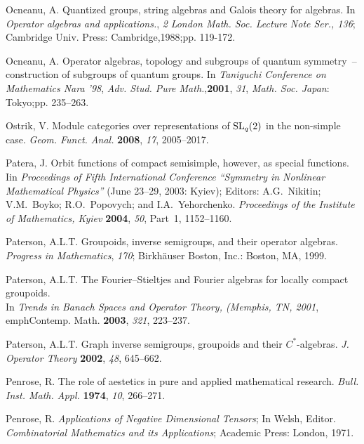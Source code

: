 \documentclass[12pt]{article}
\theoremstyle{plain}
\theoremstyle{definition}
\numberwithin{equation}{section}
\begin{document}
\begin{thebibliography}{199}
Ocneanu, A. Quantized groups, string algebras and Galois theory for algebras. In {\em Operator algebras and applications.}, {\em 2} \textit{London Math. Soc. Lecture Note Ser., 136}; Cambridge Univ. Press: Cambridge,1988;pp. 119-172.

Ocneanu, A. Operator algebras, topology and subgroups of quantum symmetry~-- construction of subgroups of quantum groups.  In {\em Taniguchi Conference on Mathematics Nara '98}, {\em Adv. Stud. Pure Math.},{\bf 2001}, {\em 31}, {\em Math. Soc. Japan}: Tokyo;pp. 235--263.

Ostrik, V.   Module categories over representations of ${\rm SL}_q(2)$ in the non-simple case. {\em Geom. Funct. Anal.} {\bf 2008}, {\em 17}, 2005--2017. %

Patera, J. Orbit functions of compact semisimple, however, as special functions. Iin {\em Proceedings of Fifth International Conference ``Symmetry in Nonlinear Mathematical Physics''} (June 23--29, 2003: Kyiev); Editors: A.G.~Nikitin; V.M.~Boyko; R.O.~Popovych; and I.A.~Yehorchenko. {\em Proceedings of the Institute of Mathematics, Kyiev} {\bf 2004}, {\em 50}, Part~1, 1152--1160.

Paterson, A.L.T.  Groupoids, inverse semigroups, and their operator algebras. {\em Progress in Mathematics}, {\em 170}; Birkh\"auser Boston, Inc.: Boston, MA, 1999.

Paterson, A.L.T. The Fourier--Stieltjes and Fourier algebras for locally compact groupoids.\\
 In {\em Trends in Banach Spaces and Operator Theory, (Memphis, TN, 2001}, \\emph{Contemp. Math.} {\bf 2003}, {\em 321}, 223--237.

Paterson, A.L.T.  Graph inverse semigroups, groupoids and their $C^*$-algebras.  {\em J. Operator Theory} {\bf 2002}, {\em 48}, 645--662. %

Penrose, R. The role of aestetics in pure and applied mathematical research. \emph{Bull. Inst. Math. Appl.} {\bf 1974}, \emph{10}, 266--271.

Penrose, R. {\em Applications of Negative Dimensional Tensors}; In Welsh, Editor. {\em Combinatorial Mathematics and its Applications}; Academic Press: London, 1971.


\end{thebibliography}
\end{document}
